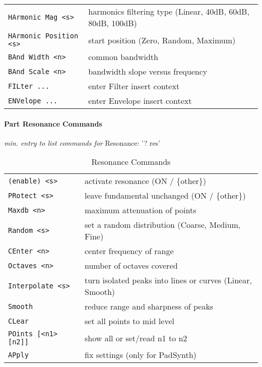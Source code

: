 \begin{table}[H]
\begin{tabular}{l l}
\texttt{HArmonic Mag <s>} &
   harmonics filtering type (Linear, 40dB, 60dB, 80dB, 100dB)\\
\texttt{HArmonic Position <s>} &
   start position (Zero, Random, Maximum)\\
\texttt{BAnd Width <n>} &
   common bandwidth \\
\texttt{BAnd Scale <n>} &
   bandwidth slope versus frequency \\
\texttt{FILter ...} &
   enter Filter insert context \\
\texttt{ENVelope ...} &
   enter Envelope insert context \\
      \end{tabular}
   \end{table}

\pagebreak
\paragraph{Part Resonance Commands}
\label{paragraph:command_line_part_resonance_commands}
   \textsl{min. entry to list commands for} Resonance: '? res'
   \begin{table}[H]
      \centering
      \caption{Resonance Commands}
      \label{table:part_resonance_commands}
      \begin{tabular}{l l}
   \texttt{(enable) <s>} &
      activate resonance (ON / \{other\}) \\
    \texttt{PRotect <s>} &
      leave fundamental unchanged (ON / \{other\}) \\
   \texttt{Maxdb <n>} &
      maximum attenuation of points \\
   \texttt{Random <s>} &
      set a random distribution (Coarse, Medium, Fine) \\
   \texttt{CEnter <n>} &
      center frequency of range \\
   \texttt{Octaves <n>} &
      number of octaves covered \\
   \texttt{Interpolate <s>} &
      turn isolated peaks into lines or curves (Linear, Smooth) \\
   \texttt{Smooth} &
      reduce range and sharpness of peaks \\
   \texttt{CLear} &
      set all points to mid level \\
   \texttt{POints [<n1> [n2]]} &
      show all or set/read n1 to n2 \\
   \texttt{APply} &
      fix settings (only for PadSynth) \\
      \end{tabular}
   \end{table}

